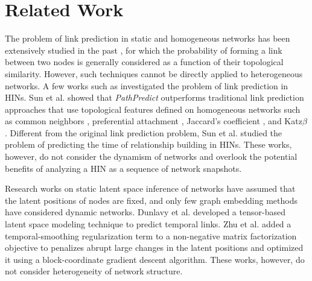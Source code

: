 \section{Related Work}


The problem of link prediction in static and homogeneous networks has been extensively studied in the past
\cite{liben2007link,wang2007local,lichtenwalter2010new,leroy2010cold,al2006link,al2011survey}, for which the probability of forming a link between two nodes is generally considered as a function of their topological similarity. However, such techniques cannot be directly applied to heterogeneous networks. A few works such as \cite{sun2011ASONAM,Sun:2012:HRP:2124295.2124373} investigated the problem of link prediction in HINs. Sun et al. \cite{sun2011ASONAM} showed that \textit{PathPredict} outperforms traditional link prediction approaches that use topological features defined on homogeneous networks such as common neighbors \cite{newman2001clustering}, preferential attachment \cite{newman2001clustering}, Jaccard's coefficient \cite{liben2007link}, and Katz$\beta$ \cite{katz1953new}. Different from the original link prediction problem, Sun et al. \cite{Sun:2012:HRP:2124295.2124373} studied the problem of predicting the time of relationship building in HINs. These works, however, do not consider the dynamism of networks and overlook the potential benefits of analyzing a HIN as a sequence of network snapshots.


Research works on static latent space inference of networks \cite{sarkar2005dynamic,menon2011link,yin2013scalable,qi2013link,ye2013predicting} have assumed that the latent positions of nodes are fixed, and only few graph embedding methods \cite{fu2009dynamic,dunlavy2011temporal,Zhu2016} have considered dynamic networks. Dunlavy et al. \cite{dunlavy2011temporal} developed a tensor-based latent space modeling technique to predict temporal links. Zhu et al. \cite{Zhu2016} added a temporal-smoothing regularization term to a non-negative matrix factorization objective to penalizes abrupt large changes in the latent positions and optimized it using a block-coordinate gradient descent algorithm. These works, however, do not consider heterogeneity of network structure.

